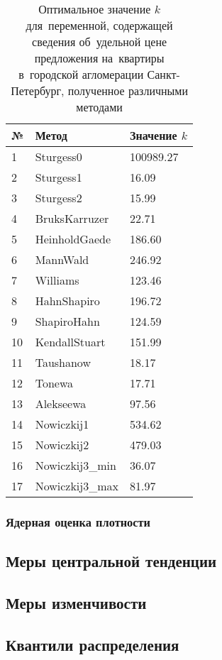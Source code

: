 \documentclass[]{scrartcl}
\begin{document}
\begin{table}[ht]
	\caption{Оптимальное значение $k$ для~переменной, содержащей сведения об~удельной цене предложения на~квартиры в~городской агломерации Санкт-Петербург, полученное различными методами} \label{tab:k-hist-optimal-spba}
	\centering%
	\begin{tabularx}{\textwidth}{lXX} 
		\hline
		№  & Метод & Значение $k$ 
		\\ \hline \hline
		1 & Sturgess0 & 100989.27 \\ 
		2 & Sturgess1 & 16.09 \\ 
		3 & Sturgess2 & 15.99 \\ 
		4 & BruksKarruzer & 22.71 \\ 
		5 & HeinholdGaede & 186.60 \\ 
		6 & MannWald & 246.92 \\ 
		7 & Williams & 123.46 \\ 
		8 & HahnShapiro & 196.72 \\ 
		9 & ShapiroHahn & 124.59 \\ 
		10 & KendallStuart & 151.99 \\ 
		11 & Taushanow & 18.17 \\ 
		12 & Tonewa & 17.71 \\ 
		13 & Alekseewa & 97.56 \\ 
		14 & Nowiczkij1 & 534.62 \\ 
		15 & Nowiczkij2 & 479.03 \\ 
		16 & Nowiczkij3\_min & 36.07 \\ 
		17 & Nowiczkij3\_max & 81.97 \\
		\hline	
	\end{tabularx}
\end{table}

\subsubsection{Ядерная оценка плотности}
\subsection{Меры центральной тенденции}

\subsection{Меры изменчивости}

\subsection{Квантили распределения}
\end{document}
